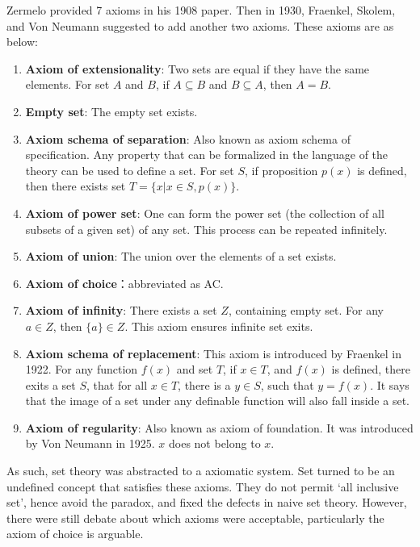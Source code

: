 \documentclass[b5paper]{article}
\begin{document}
Zermelo provided 7 axioms in his 1908 paper. Then in 1930, Fraenkel, Skolem, and Von Neumann suggested to add another two axioms. These axioms are as below:

\begin{enumerate}
\item \textbf{Axiom of extensionality}: Two sets are equal if they have the same elements. For set $A$ and $B$, if $A \subseteq B$ and $B \subseteq A$, then $A = B$.

\item \textbf{Empty set}: The empty set exists.

\item \textbf{Axiom schema of separation}: Also known as axiom schema of specification. Any property that can be formalized in the language of the theory can be used to define a set. For set $S$, if proposition $p(x)$ is defined, then there exists set $T = \{ x | x \in S, p(x)\}$.

\item \textbf{Axiom of power set}: One can form the power set (the collection of all subsets of a given set) of any set. This process can be repeated infinitely.

\item \textbf{Axiom of union}: The union over the elements of a set exists.

\item \textbf{Axiom of choice}：abbreviated as AC.

\item \textbf{Axiom of infinity}: There exists a set $Z$, containing empty set. For any $a \in Z$, then $\{a\} \in Z$. This axiom ensures infinite set exits.

\item \textbf{Axiom schema of replacement}: This axiom is introduced by Fraenkel in 1922. For any function $f(x)$ and set $T$, if $x \in T$, and $f(x)$ is defined, there exits a set $S$, that for all $x \in T$, there is a $y \in S$, such that $y = f(x)$. It says that the image of a set under any definable function will also fall inside a set.

\item \textbf{Axiom of regularity}: Also known as axiom of foundation. It was introduced by Von Neumann in 1925. $x$ does not belong to $x$.
\end{enumerate}

As such, set theory was abstracted to a axiomatic system. Set turned to be an undefined concept that satisfies these axioms. They do not permit `all inclusive set', hence avoid the paradox, and fixed the defects in naive set theory. However, there were still debate about which axioms were acceptable, particularly the axiom of choice is arguable.
\end{document}
